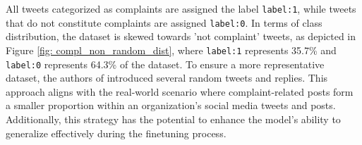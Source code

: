 All tweets categorized as complaints are assigned the label \texttt{label:1}, while tweets that do not constitute complaints are assigned \texttt{label:0}. In terms of class distribution, the dataset is skewed towards 'not complaint' tweets, as depicted in Figure \ref{fig: compl_non_random_dist}, where \texttt{label:1} represents 35.7\% and \texttt{label:0} represents 64.3\% of the dataset. To ensure a more representative dataset, the authors of \cite{preotiuc-pietro_automatically_2019} introduced several random tweets and replies. This approach aligns with the real-world scenario where complaint-related posts form a smaller proportion within an organization's social media tweets and posts. Additionally, this strategy has the potential to enhance the model's ability to generalize effectively during the finetuning process.\\

